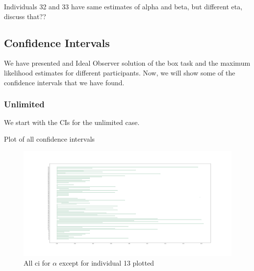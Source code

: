 Individuals 32 and 33 have same estimates of alpha and beta, but different eta, discuss that??











\subsection{Confidence Intervals}
We have presented and Ideal Observer solution of the box task and the maximum likelihood estimates for different participants. Now, we will show some of the confidence intervals that we have found. 

\subsubsection{Unlimited}
We start with the CIs for the unlimited case.

Plot of all confidence intervals
\begin{figure}
    \centering
    \includegraphics[scale=0.3]{pictures/all_cis_unlim_alpha.png}
    \caption{All ci for $\alpha$ except for individual 13 plotted}
    \label{fig:all_cis_alpha_unlim}
\end{figure}




